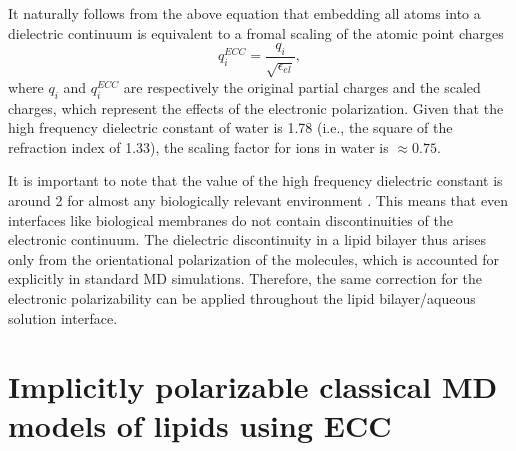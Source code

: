 It naturally follows from the above equation that 
embedding all atoms into a dielectric continuum 
is equivalent to a fromal scaling of the atomic point charges 
\begin{equation}  \label{eq:scaling}
 q_i ^{ECC} = \frac{q_i}{\sqrt{\epsilon _{el}}} ,
\end{equation} 
where $q_i$ and $q_i^{ECC}$ are respectively the original partial charges and the scaled charges, 
which represent the effects of the electronic polarization. 
Given that the  high frequency dielectric constant of water is 1.78 (i.e., the square of the refraction index of 1.33), 
the scaling factor for ions in water is $\approx 0.75$. 

It is important to note that the value of the high frequency dielectric constant  
is around 2 for almost any biologically relevant environment \citep{leontyev11}. 
This means that even interfaces like biological membranes do not contain discontinuities of the electronic continuum. 
The dielectric discontinuity in a lipid bilayer thus arises only 
from the orientational polarization of the molecules, which is accounted for explicitly in standard MD simulations.  
Therefore, the same correction for the electronic polarizability can be  
applied throughout the lipid bilayer/aqueous solution interface. 




 

 
 



\section{Implicitly polarizable classical MD models of lipids using ECC}
\label{section:ecc-lipids}


